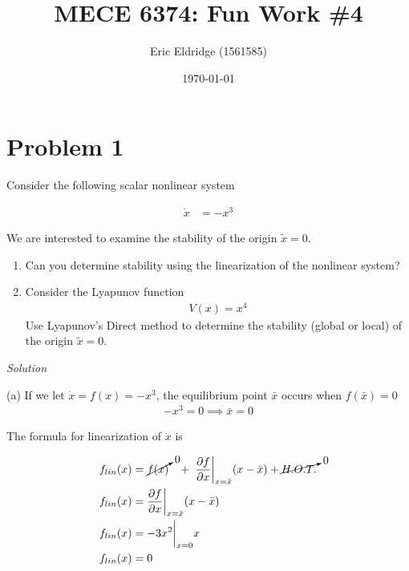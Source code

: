 \documentclass{article}
\title{MECE 6374: Fun Work \#4}
\date{\today}
\author{Eric Eldridge (1561585)}
\begin{document}

  \maketitle

  \section{Problem 1}

  Consider the following scalar nonlinear system

  \begin{align*}
    \dot{x} &= -x^3
  \end{align*}

  \noindent We are interested to examine the stability of the origin $\tilde{x}=0$.

  \begin{enumerate}[label=(\alph*)]
    \item Can you determine stability using the linearization of the nonlinear system?
    \item Consider the Lyapunov function
          \begin{align*}
            V(x) = x^4
          \end{align*}
          Use Lyapunov's Direct method to determine the stability (global or local)
          of the origin $\tilde{x}=0$.
  \end{enumerate} 

  \vspace{3mm}
  
  \noindent \textit{Solution} \newline \newline

  (a) If we let $\dot{x}=f(x)=-x^3$, the equilibrium point $\bar{x}$ occurs when
  $f(\bar{x})=0$ \newline
  \begin{align*}
    -x^3 = 0 \implies \bar{x}=0
  \end{align*}

  \indent The formula for linearization of $\dot{x}$ is

  \begin{align*}
    f_{lin}(x) &= \cancelto{0}{f(x)} \hspace{3.0mm} + \hspace{1.0mm}
    \frac{\partial f}{\partial x}\bigg|_{x=\bar{x}}(x-\bar{x}) + \cancelto{0}{H.O.T.} \\ 
    f_{lin}(x) &= \frac{\partial f}{\partial x}\bigg|_{x=\bar{x}}(x-\bar{x}) \\
    f_{lin}(x) &= -3x^2\bigg|_{x=0}x \\
    f_{lin}(x) &= 0
  \end{align*}
\end{document}
